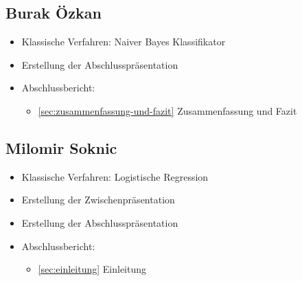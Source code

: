 \begin{multicols}{2}
\subsection{Burak Özkan}
\begin{itemize}
    \item Klassische Verfahren: Naiver Bayes Klassifikator
    \item Erstellung der Abschlusspräsentation
    \item Abschlussbericht:
    \begin{itemize}
        \item \ref{sec:zusammenfassung-und-fazit} Zusammenfassung und Fazit
    \end{itemize}
\end{itemize}

\subsection{Milomir Soknic}
\begin{itemize}
    \item Klassische Verfahren: Logistische Regression
    \item Erstellung der Zwischenpräsentation
    \item Erstellung der Abschlusspräsentation
    \item Abschlussbericht:
    \begin{itemize}
        \item \ref{sec:einleitung} Einleitung
    \end{itemize}
\end{itemize}

\end{multicols}
